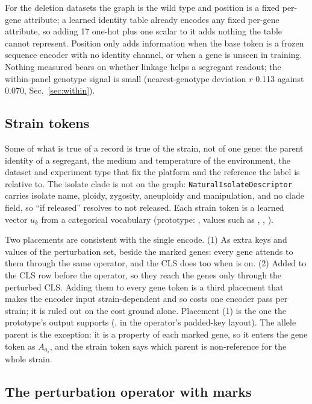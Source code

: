  For the deletion datasets the graph is the wild type
and position is a fixed per-gene attribute; a learned identity table already encodes
any fixed per-gene attribute, so adding 17 one-hot plus one scalar to it adds nothing
the table cannot represent. Position only adds information when the base token is a
frozen sequence encoder with no identity channel, or when a gene is unseen in training.
Nothing measured bears on whether linkage helps a segregant readout; the within-panel
genotype signal is small (nearest-genotype deviation $r$ 0.113 against 0.070,
Sec.~\ref{sec:within}).

\subsection{Strain tokens}
\label{sec:input-strain}

Some of what is true of a record is true of the strain, not of one gene: the parent
identity of a segregant, the medium and temperature of the environment, the dataset
and experiment type that fix the platform and the reference the label is relative to.
The isolate clade is not on the graph: \texttt{NaturalIsolateDescriptor} carries
isolate name, ploidy, zygosity, aneuploidy and manipulation, and no clade field, so
``if released'' resolves to not released. Each strain token is a learned vector $u_k$
from a categorical vocabulary (prototype: , values such as
, , ).

 Two placements are consistent with the single encode. (1)
As extra keys and values of the perturbation set, beside the marked genes: every gene
attends to them through the same operator, and the CLS does too when
 is on. (2) Added to the CLS row before the operator, so they reach
the genes only through the perturbed CLS. Adding them to every gene token is a third
placement that makes the encoder input strain-dependent and so costs one encoder pass
per strain; it is ruled out on the cost ground alone. Placement (1) is the one the
prototype's output supports (,  in the
operator's padded-key layout). The allele parent is the exception: it is a property of
each marked gene, so it enters the gene token as $A_{a_i}$, and the strain token
 says which parent is non-reference for the whole strain.

\subsection{The perturbation operator with marks}
\label{sec:input-operator}

